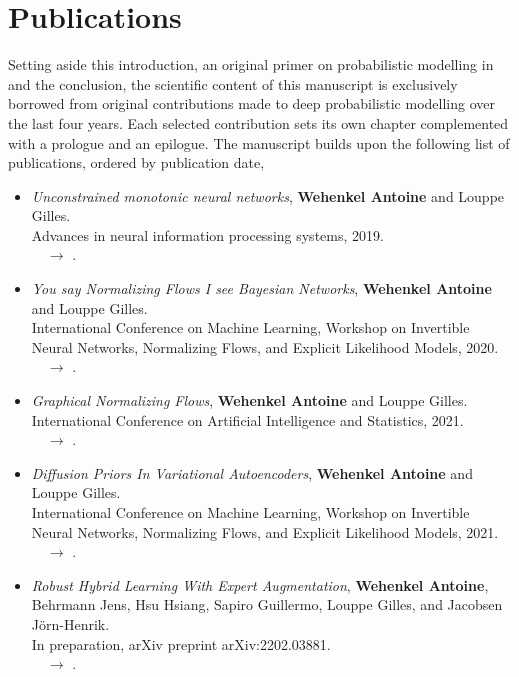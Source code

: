 \section{Publications}
Setting aside this introduction, an original primer on probabilistic modelling in  and the conclusion,
the scientific content of this manuscript is exclusively borrowed from original contributions made to deep probabilistic modelling over the last four years.
Each selected contribution sets its own chapter complemented with a prologue and an epilogue.
The manuscript builds upon the following list of publications, ordered by publication date,
  \begin{itemize}
  \item[] \citep{wehenkel_unconstrained_2019} \textit{Unconstrained monotonic neural networks},
  \textbf{Wehenkel Antoine} and Louppe Gilles.\\
  Advances in neural information processing systems, 2019.\\
  $\quad \rightarrow$ .

  \item[] \citep{wehenkel_you_2020} \textit{You say Normalizing Flows I see Bayesian Networks},
  \textbf{Wehenkel Antoine} and Louppe Gilles.\\
  International Conference on Machine Learning, Workshop on Invertible Neural Networks, Normalizing Flows, and Explicit Likelihood Models, 2020.\\
  $\quad \rightarrow$ .

  \item[] \citep{wehenkel2021graphical} \textit{Graphical Normalizing Flows},
  \textbf{Wehenkel Antoine} and Louppe Gilles.\\
  International Conference on Artificial Intelligence and Statistics, 2021.\\
  $\quad \rightarrow$ .

  \item[] \citep{wehenkel2021diffusion} \textit{Diffusion Priors In Variational Autoencoders},
  \textbf{Wehenkel Antoine} and Louppe Gilles.\\
  International Conference on Machine Learning, Workshop on Invertible Neural Networks, Normalizing Flows, and Explicit Likelihood Models, 2021.\\
  $\quad \rightarrow$ .

  \item[] \citep{wehenkel2022robust} \textit{Robust Hybrid Learning With Expert Augmentation},
  \textbf{Wehenkel Antoine}, Behrmann Jens, Hsu Hsiang, Sapiro Guillermo, Louppe Gilles, and Jacobsen J{\"o}rn-Henrik.\\
  In preparation, arXiv preprint arXiv:2202.03881.\\
  $\quad \rightarrow$ .

  \end{itemize}


